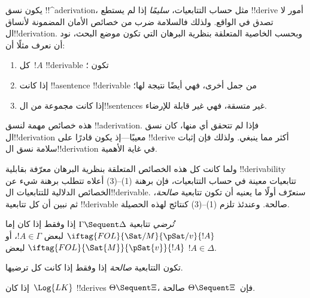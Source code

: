 \documentclass[../../../include/open-logic-section]{subfiles}
\begin{document}
      {}
      {}


\begin{explain}
يكون نسق !!^a{derivation}، مثل حساب التتابعيات، \emph{سليمًا} إذا لم
يستطع !!{derive} أمور لا تصدق في الواقع. ولذلك فالسلامة ضرب من خصائص
الأمان المضمونة لأنساق ال!!{derivation}. وبحسب الخاصية المتعلقة بنظرية
البرهان التي تكون موضع البحث، نود أن نعرف مثلًا أن:
\begin{enumerate}
\item كل~$!A$ !!{derivable} تكون ؛
\item إذا كانت !!a{sentence} !!{derivable} من جمل أخرى، فهي أيضًا
  نتيجة لها؛
\item إذا كانت مجموعة من ال!!{sentence}s غير متسقة، فهي غير قابلة
  للإرضاء.
\end{enumerate}
هذه خصائص مهمة لنسق !!a{derivation}. فإذا لم تتحقق أي منها، كان نسق
ال!!{derivation} معيبًا---إذ يكون قادرًا على !!{derive} أكثر مما ينبغي.
ولذلك فإن إثبات سلامة نسق ال!!{derivation} في غاية الأهمية.

ولما كانت كل هذه الخصائص المتعلقة بنظرية البرهان معرّفة بقابلية
!!{derivability} تتابعيات معينة في حساب التتابعيات، فإن برهنة
(1)--(3) أعلاه تتطلب برهنة شيء عن الخصائص الدلالية للتتابعيات
ال!!{derivable}. سنعرّف أولًا ما يعنيه أن تكون تتابعية \emph{صالحة}،
ثم نبين أن كل تتابعية !!{derivable} صالحة. وعندئذ تلزم (1)--(3)
كنتائج لهذه الحصيلة.
\end{explain}

\begin{defn}
 \emph{تُرضي} تتابعية
$\Gamma \Sequent \Delta$ إذا وفقط إذا كان إما
$\iftag{FOL}{\Sat/{M}}{\pSat/{v}}{!A}$ لبعض $!A \in \Gamma$، أو
$\iftag{FOL}{\Sat{M}}{\pSat{v}}{!A}$ لبعض $!A \in \Delta$.

تكون التتابعية \emph{صالحة} إذا وفقط إذا كانت كل
ترضيها.
\end{defn}

\begin{thm}[السلامة]
 إذا كان~$\Log{LK}$ !!{derive}s
$\Theta \Sequent \Xi$، فإن~$\Theta \Sequent \Xi$ صالحة.
\end{thm}
\end{document}
